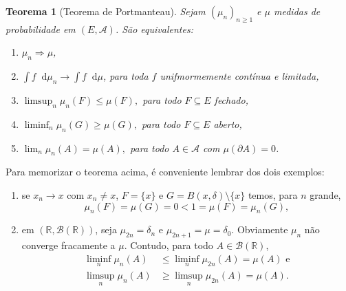 \documentclass[reqno]{article}
\newcommand*\1{\mathds{1}}
\newtheorem{theorem}{Teorema}[section]
\renewcommand*\d{\mathop{}\!\mathrm{d}}
\begin{document}
\begin{theorem}[Teorema de Portmanteau]
  \label{t:portmanteau}
  Sejam $(\mu_n)_{n \geq 1}$ e $\mu$ medidas de probabilidade em $(E, \mathcal{A})$.
  São equivalentes:
  \begin{enumerate}
  \item[a)] $\mu_n \Rightarrow \mu$,
  \item[a')] $\int f \d \mu_n \to \int f \d \mu$, para toda $f$ unifmormemente contínua e limitada,
  \item[b)] $\limsup_n \mu_n(F) \leq \mu(F),$ para todo $F \subseteq E$ fechado,
  \item[b')] $\liminf_n \mu_n(G) \geq \mu(G),$ para todo $F \subseteq E$ aberto,
  \item[c)] $\lim_n \mu_n(A) = \mu(A),$ para todo $A \in \mathcal{A}$ com $\mu(\partial A) = 0$.
  \end{enumerate}
\end{theorem}

Para memorizar o teorema acima, é conveniente lembrar dos dois exemplos:
\begin{enumerate}[\quad i)]
  \item se $x_n \to x$ com $x_n \neq x$, $F = \{x\}$ e $G = B(x, \delta) \setminus \{x\}$ temos, para $n$ grande,
    \begin{equation}
      \mu_n(F) = \mu(G) = 0 < 1 = \mu(F) = \mu_n(G),
    \end{equation}
  \item em $(\mathbb{R},\mathcal{B}(\mathbb{R}))$, seja $\mu_{2n} = \delta_n$ e $\mu_{2n+1} = \mu = \delta_0$.
    Obviamente $\mu_n$ não converge fracamente a $\mu$. Contudo, para todo $A \in \mathcal{B}(\mathbb{R})$,
    \begin{equation}
      \begin{split}
        \liminf_n \mu_n (A) & \leq \liminf_n \mu_{2n}(A) = \mu(A) \text{ e}\\
        \limsup_n \mu_n (A) & \geq \limsup_n \mu_{2n}(A) = \mu(A).
      \end{split}
    \end{equation}
\end{enumerate}
\end{document}
